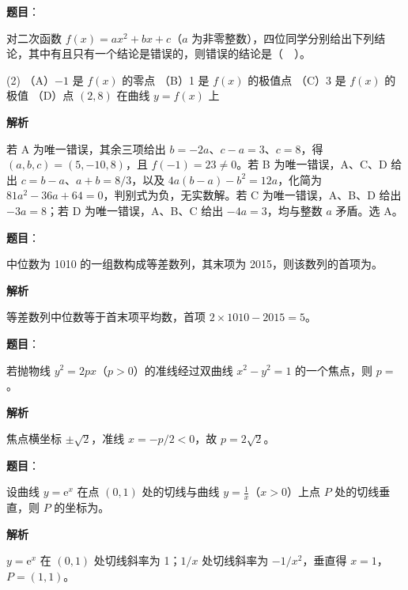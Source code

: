 \begin{answer}

\textbf{题目}：

对二次函数 $f(x)=ax^2+bx+c$（$a$ 为非零整数），四位同学分别给出下列结论，其中有且只有一个结论是错误的，则错误的结论是（　）。

\begin{gkopts}(2)
\task （A）$-1$ 是 $f(x)$ 的零点
\task （B）1 是 $f(x)$ 的极值点
\task （C）3 是 $f(x)$ 的极值
\task （D）点 $(2,8)$ 在曲线 $y=f(x)$ 上
\end{gkopts}

\textbf{解析}

若 A 为唯一错误，其余三项给出 $b=-2a$、$c-a=3$、$c=8$，得 $(a,b,c)=(5,-10,8)$，且 $f(-1)=23\ne0$。若 B 为唯一错误，A、C、D 给出 $c=b-a$、$a+b=8/3$，以及 $4a(b-a)-b^2=12a$，化简为 $81a^2-36a+64=0$，判别式为负，无实数解。若 C 为唯一错误，A、B、D 给出 $-3a=8$；若 D 为唯一错误，A、B、C 给出 $-4a=3$，均与整数 $a$ 矛盾。选 A。


\end{answer}
\begin{answer}

\textbf{题目}：

中位数为 1010 的一组数构成等差数列，其末项为 2015，则该数列的首项为\gkblank{}。

\textbf{解析}

等差数列中位数等于首末项平均数，首项 $2\times1010-2015=5$。


\end{answer}
\begin{answer}

\textbf{题目}：

若抛物线 $y^2=2px$（$p>0$）的准线经过双曲线 $x^2-y^2=1$ 的一个焦点，则 $p=$\gkblank{}。

\textbf{解析}

焦点横坐标 $\pm\sqrt2$，准线 $x=-p/2<0$，故 $p=2\sqrt2$。


\end{answer}
\begin{answer}

\textbf{题目}：

设曲线 $y=\mathrm e^x$ 在点 $(0,1)$ 处的切线与曲线 $y=\frac1x$（$x>0$）上点 $P$ 处的切线垂直，则 $P$ 的坐标为\gkblank{}。

\textbf{解析}

$y=\mathrm e^x$ 在 $(0,1)$ 处切线斜率为 1；$1/x$ 处切线斜率为 $-1/x^2$，垂直得 $x=1$，$P=(1,1)$。


\end{answer}
